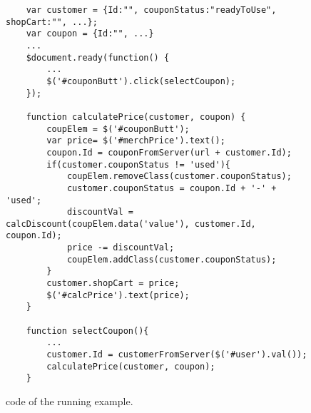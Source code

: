 \begin{figure}
\begin{lstlisting}
	var customer = {Id:"", couponStatus:"readyToUse", shopCart:"", ...};
	var coupon = {Id:"", ...}
	...
	$document.ready(function() {
		...
		$('#couponButt').click(selectCoupon);
	});
	
	function calculatePrice(customer, coupon) {
		coupElem = $('#couponButt');
		var price= $('#merchPrice').text();
		coupon.Id = couponFromServer(url + customer.Id);
		if(customer.couponStatus != 'used'){
			coupElem.removeClass(customer.couponStatus);
			customer.couponStatus = coupon.Id + '-' + 'used';
			discountVal = calcDiscount(coupElem.data('value'), customer.Id, coupon.Id);
			price -= discountVal;	
			coupElem.addClass(customer.couponStatus);
		} 	
		customer.shopCart = price;
		$('#calcPrice').text(price);  
	}
	
	function selectCoupon(){
		...
		customer.Id = customerFromServer($('#user').val());
		calculatePrice(customer, coupon);
	}

\end{lstlisting}
\vspace{-0.1in} 

\caption{\javascript code of the running example.}
\label{Fig:example}
\vspace{-0.2in} 

\end{figure}